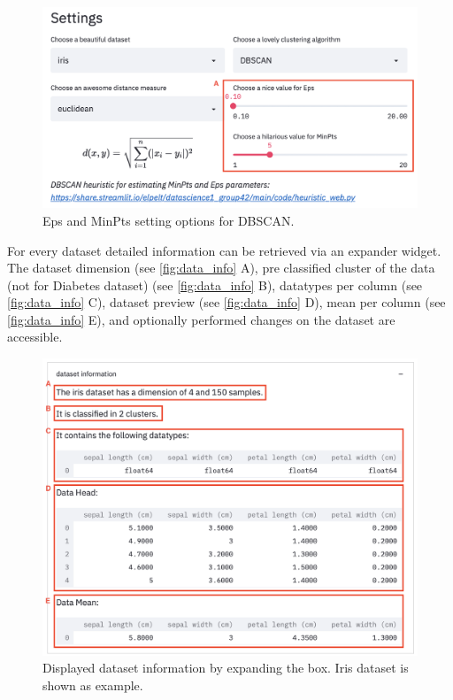 \documentclass[12pt, english]{article}
\begin{document}
\begin{figure}[H]
	\centering
	\includegraphics[width=\linewidth]{modules/web_frontend/DBSCAN_settings.png}
	\caption{Eps and MinPts setting options for DBSCAN.}\label{fig:dbscan_para}
\end{figure}

For every dataset detailed information can be retrieved via an expander widget. The dataset dimension (see \autoref{fig:data_info} A), pre classified cluster of the data (not for Diabetes dataset) (see \autoref{fig:data_info} B), datatypes per column (see \autoref{fig:data_info} C), dataset preview (see \autoref{fig:data_info} D), mean per column (see \autoref{fig:data_info} E), and optionally performed changes on the dataset are accessible.

\begin{figure}[H]
	\centering
	\includegraphics[width=\linewidth]{modules/web_frontend/dataset_inofs.png}
	\caption{Displayed dataset information by expanding the box. Iris dataset is shown as example.}\label{fig:data_info}
\end{figure}
\end{document}
